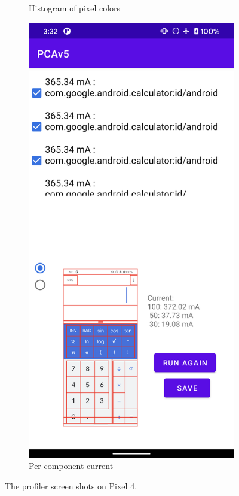 \begin{figure}[tp]
\begin{subfigure}[]{0.30\columnwidth}
		\caption{Histogram of pixel colors}
		\label{fig:tool1_screenshot_d}
	\end{subfigure}
        \hfill 
	\begin{subfigure}[]{0.30\columnwidth}
		\includegraphics[width=\textwidth]{figure/002_app_break_down.png}
		\caption{Per-component current}
		\label{fig:tool1_screenshot_c}
	\end{subfigure}
        \vspace{-0.1in}
	\caption{The \appwithlink profiler screen shots on Pixel 4.}
	\label{fig:tool1_screenshot}
    \vspace{-0.2in}
\end{figure}

